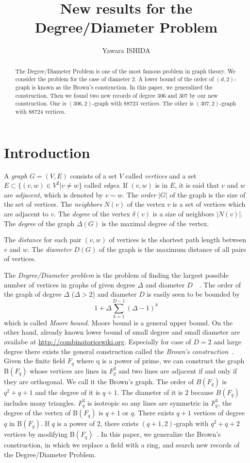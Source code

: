 \documentclass{article}
\title{New results for the Degree/Diameter Problem}
\author{Yawara ISHIDA}
\newcommand{\B}{\mathrm{B}}
\begin{document}
\maketitle
\begin{abstract}
The Degree/Diameter Problem is one of the most famous problem in graph theory. 
We consider the problem for the case of diameter 2.
A lower bound of the order of $(d,2)$-graph is known as the Brown's construction.
In this paper, we generalized the construction.
Then we found two new records of degree $306$ and $307$ by our new construction.
One is $(306,2)$-graph with $88723$ vertices.
The other is $(307,2)$-graph with $88724$ vertices.
\end{abstract}

\section{Introduction}
A {\it graph} $G=(V,E)$ consists of a set $V$ called {\it vertices} and a set $E \subset \{(v,w) \in V^2 | v \neq w \}$ called {\it edges}.
If $(v,w)$ is in $E$, it is said that $v$ and $w$ are {\it adjacent}, which is denoted by $v \sim w$.
The {\it order} $|G|$ of the graph is the size of the set of vertices. 
The {\it neighbors} $N(v)$ of the vertex $v$ is a set of vertices which are adjacent to $v$.
The {\it degree} of the vertex $\delta(v)$ is a size of neighbors $| N(v) |$.  
The {\it degree} of the graph $\Delta(G)$ is the maximal degree  of the vertex.
\iffalse
The graph is {\it regular} if every vertex's degree are same.
\fi
The {\it distance} for each pair $(v,w)$ of vertices is the shortest path length between $v$ and $w$. 
The {\it diameter} $D(G)$ of the graph is the  maximum distance of all pairs of vertices. 

The {\it Degree/Diameter problem} is the problem of finding the largest possible number of vertices in graphs of given degree $\Delta$ and diameter $D$~\cite{MilSir2005}~\cite{brown1966graphs}. 
The order of the graph of degree $\Delta$ ($\Delta > 2$) and diameter $D$ is easily seen to be bounded by 
\[ 1 + \Delta \sum_{k=1}^{D-1} (\Delta - 1)^k\]
which is called {\it Moore bound}.
Moore bound is a general upper bound. 
On the other hand, already known lower bound of small degree and small diameter are availabe at \url{http://combinatoricswiki.org}. 
Especially for case of $D=2$ and large degree there exists the general construction called the {\it Brown's construction}~\cite{MilSir2005}.
Given the finite field $F_q$ where q is a power of prime, we can construct the graph $\B(F_q)$ whose vertices are lines in $F_q^3$ and two lines are adjacent if and only if they are orthogonal. 
We call it the Brown's graph.
The order of $B(F_q)$ is $q^2+q+1$ and the degree of it is $q+1$. The diameter of it is $2$ because $B(F_q)$ includes many triangles. 
$F_q^3$ is isotropic so any lines are symmetric in $F_q^3$, the degree of the vertex of $\B(F_q)$ is $q+1$ or $q$. 
There exists $q+1$ vertices of degree $q$ in $\B(F_q)$.
If $q$ is a power of $2$, there exists $(q+1,2)$-graph with $q^2+q+2$ vertices by modifying $\B(F_q)$~\cite{journals/networks/ErdosFH80}.
In this paper, we generalize the Brown's construction, in which we replace a field with a ring, and search new records of the Degree/Diameter Problem.
\end{document}
